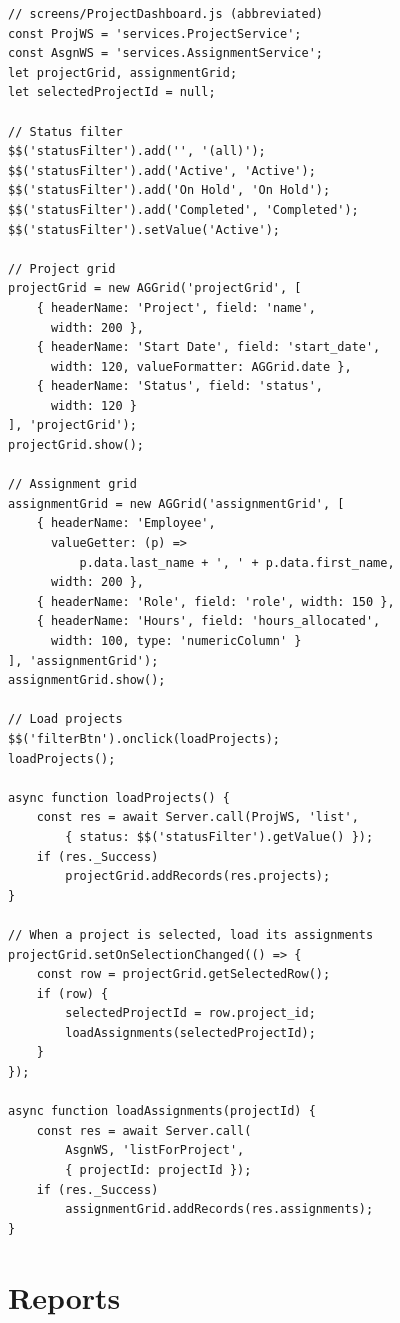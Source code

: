 \begin{lstlisting}[style=javascript]
// screens/ProjectDashboard.js (abbreviated)
const ProjWS = 'services.ProjectService';
const AsgnWS = 'services.AssignmentService';
let projectGrid, assignmentGrid;
let selectedProjectId = null;

// Status filter
$$('statusFilter').add('', '(all)');
$$('statusFilter').add('Active', 'Active');
$$('statusFilter').add('On Hold', 'On Hold');
$$('statusFilter').add('Completed', 'Completed');
$$('statusFilter').setValue('Active');

// Project grid
projectGrid = new AGGrid('projectGrid', [
    { headerName: 'Project', field: 'name',
      width: 200 },
    { headerName: 'Start Date', field: 'start_date',
      width: 120, valueFormatter: AGGrid.date },
    { headerName: 'Status', field: 'status',
      width: 120 }
], 'projectGrid');
projectGrid.show();

// Assignment grid
assignmentGrid = new AGGrid('assignmentGrid', [
    { headerName: 'Employee',
      valueGetter: (p) =>
          p.data.last_name + ', ' + p.data.first_name,
      width: 200 },
    { headerName: 'Role', field: 'role', width: 150 },
    { headerName: 'Hours', field: 'hours_allocated',
      width: 100, type: 'numericColumn' }
], 'assignmentGrid');
assignmentGrid.show();

// Load projects
$$('filterBtn').onclick(loadProjects);
loadProjects();

async function loadProjects() {
    const res = await Server.call(ProjWS, 'list',
        { status: $$('statusFilter').getValue() });
    if (res._Success)
        projectGrid.addRecords(res.projects);
}

// When a project is selected, load its assignments
projectGrid.setOnSelectionChanged(() => {
    const row = projectGrid.getSelectedRow();
    if (row) {
        selectedProjectId = row.project_id;
        loadAssignments(selectedProjectId);
    }
});

async function loadAssignments(projectId) {
    const res = await Server.call(
        AsgnWS, 'listForProject',
        { projectId: projectId });
    if (res._Success)
        assignmentGrid.addRecords(res.assignments);
}
\end{lstlisting}

\section{Reports}
\label{sec:app-reports}

